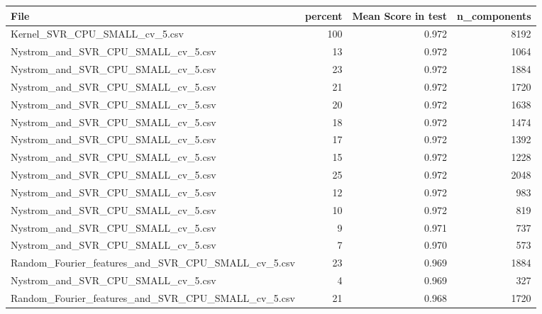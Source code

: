 \begin{tabularx}{\textwidth}{lrrr}
\toprule
                                              File &  percent &  Mean Score in test &  n\_components \\
\midrule
                     Kernel\_SVR\_CPU\_SMALL\_cv\_5.csv &      100 &               0.972 &          8192 \\
                Nystrom\_and\_SVR\_CPU\_SMALL\_cv\_5.csv &       13 &               0.972 &          1064 \\
                Nystrom\_and\_SVR\_CPU\_SMALL\_cv\_5.csv &       23 &               0.972 &          1884 \\
                Nystrom\_and\_SVR\_CPU\_SMALL\_cv\_5.csv &       21 &               0.972 &          1720 \\
                Nystrom\_and\_SVR\_CPU\_SMALL\_cv\_5.csv &       20 &               0.972 &          1638 \\
                Nystrom\_and\_SVR\_CPU\_SMALL\_cv\_5.csv &       18 &               0.972 &          1474 \\
                Nystrom\_and\_SVR\_CPU\_SMALL\_cv\_5.csv &       17 &               0.972 &          1392 \\
                Nystrom\_and\_SVR\_CPU\_SMALL\_cv\_5.csv &       15 &               0.972 &          1228 \\
                Nystrom\_and\_SVR\_CPU\_SMALL\_cv\_5.csv &       25 &               0.972 &          2048 \\
                Nystrom\_and\_SVR\_CPU\_SMALL\_cv\_5.csv &       12 &               0.972 &           983 \\
                Nystrom\_and\_SVR\_CPU\_SMALL\_cv\_5.csv &       10 &               0.972 &           819 \\
                Nystrom\_and\_SVR\_CPU\_SMALL\_cv\_5.csv &        9 &               0.971 &           737 \\
                Nystrom\_and\_SVR\_CPU\_SMALL\_cv\_5.csv &        7 &               0.970 &           573 \\
Random\_Fourier\_features\_and\_SVR\_CPU\_SMALL\_cv\_5.csv &       23 &               0.969 &          1884 \\
                Nystrom\_and\_SVR\_CPU\_SMALL\_cv\_5.csv &        4 &               0.969 &           327 \\
Random\_Fourier\_features\_and\_SVR\_CPU\_SMALL\_cv\_5.csv &       21 &               0.968 &          1720 \\

\end{tabularx}
